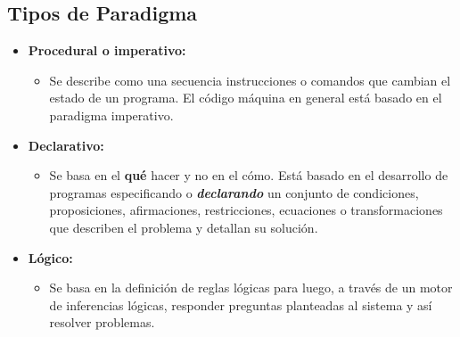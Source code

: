 \documentclass{beamer}
\begin{document}
\subsection{Tipos de Paradigma}

\begin{frame}

  \begin{itemize}
  \item \textbf{Procedural o imperativo:}
    \begin{itemize}
    \item Se describe como una secuencia instrucciones o comandos
      que cambian el estado de un programa. El código máquina en
      general está basado en el paradigma imperativo.
    \end{itemize}
    
  \item \textbf{Declarativo:}
    \begin{itemize}
    \item Se basa en el \textbf{qué} hacer y no en el cómo. Está
      basado en el desarrollo de programas especificando o
      \textbf{{\em declarando}} un conjunto de condiciones,
      proposiciones, afirmaciones, restricciones, ecuaciones o
      transformaciones que describen el problema y detallan su
      solución.
    \end{itemize}
    
  \item \textbf{Lógico:}
    \begin{itemize}
    \item Se basa en la definición de reglas lógicas para luego, a
      través de un motor de inferencias lógicas, responder preguntas
      planteadas al sistema y así resolver problemas.
    \end{itemize}
  \end{itemize}

\end{frame}
\end{document}
